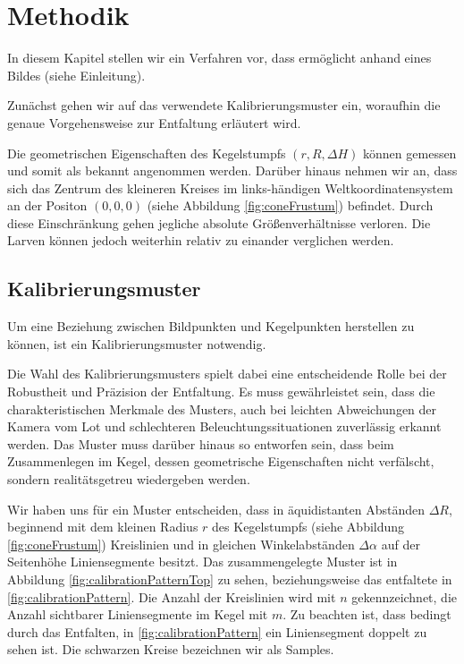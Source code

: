 \chapter{Methodik}
\label{ch:method}

In diesem Kapitel stellen wir ein Verfahren vor, dass ermöglicht anhand eines Bildes (siehe Einleitung).

Zunächst gehen wir auf das verwendete Kalibrierungsmuster ein, woraufhin die genaue Vorgehensweise zur Entfaltung erläutert wird. 

Die geometrischen Eigenschaften des Kegelstumpfs $(r, R, \Delta H)$ können gemessen und somit als bekannt angenommen werden. 
Darüber hinaus nehmen wir an, dass sich das Zentrum des kleineren Kreises im links-händigen Weltkoordinatensystem an der Positon $(0,0,0)$ (siehe Abbildung \ref{fig:coneFrustum}) befindet. Durch diese Einschränkung gehen jegliche absolute Größenverhältnisse verloren. Die Larven können jedoch weiterhin relativ zu einander verglichen werden. 


\section{Kalibrierungsmuster}
\label{s:calibrationPattern}
Um eine Beziehung zwischen Bildpunkten und Kegelpunkten herstellen zu können, ist ein Kalibrierungsmuster notwendig.

Die Wahl des Kalibrierungsmusters spielt dabei eine entscheidende Rolle bei der Robustheit und Präzision der Entfaltung. Es muss gewährleistet sein, dass die charakteristischen Merkmale des Musters, auch bei leichten Abweichungen der Kamera vom Lot und schlechteren Beleuchtungssituationen zuverlässig erkannt werden. Das Muster muss darüber hinaus so entworfen sein, dass beim Zusammenlegen im Kegel, dessen geometrische Eigenschaften nicht verfälscht, sondern realitätsgetreu wiedergeben werden. 

Wir haben uns für ein Muster entscheiden, dass in äquidistanten Abständen $\Delta R$, beginnend mit dem kleinen Radius $r$ des Kegelstumpfs (siehe Abbildung \ref{fig:coneFrustum}) Kreislinien und in gleichen Winkelabständen $\Delta \alpha$ auf der Seitenhöhe Liniensegmente besitzt. Das zusammengelegte Muster ist in Abbildung \ref{fig:calibrationPatternTop} zu sehen, beziehungsweise das entfaltete in \ref{fig:calibrationPattern}. Die Anzahl der Kreislinien wird mit $n$ gekennzeichnet, die Anzahl sichtbarer Liniensegmente im Kegel mit $m$. Zu beachten ist, dass bedingt durch das Entfalten, in \ref{fig:calibrationPattern}  ein Liniensegment doppelt zu sehen ist. Die schwarzen Kreise bezeichnen wir als Samples. 


